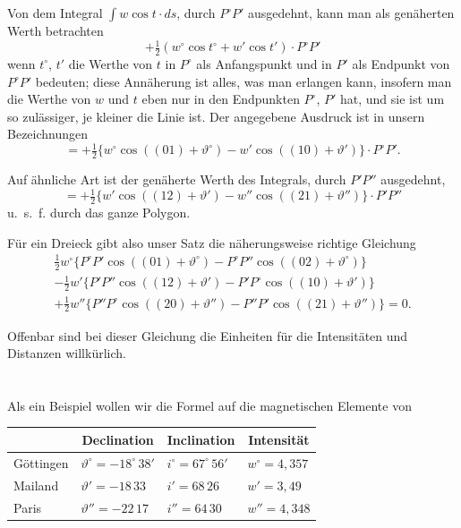 \documentclass[fontsize=11pt,paper=a4,twoside,openany]{scrbook}
\begin{document}
Von dem Integral $\int w\cos t\cdot ds$, durch $P^{\circ}P'$ ausgedehnt, kann man als genäherten Werth betrachten
\[
+\tfrac{1}{2}(w^{\circ}\cos t^{\circ} + w'\cos t')\cdot P^{\circ}P'
\]
wenn $t^{\circ}$, $t'$ die Werthe von $t$ in $P^{\circ}$ als Anfangspunkt und in $P'$ als Endpunkt von $P^{\circ}P'$ bedeuten; diese Annäherung ist alles, was man erlangen kann, insofern man die Werthe von $w$ und $t$ eben nur in den Endpunkten $P^{\circ}$, $P'$ hat, und sie ist um so zulässiger, je kleiner die Linie ist. Der angegebene Ausdruck ist in unsern Bezeichnungen
\[
= +\tfrac{1}{2}\{w^{\circ}\cos((01)+\vartheta^{\circ}) - w'\cos((10)+\vartheta')\}\cdot P^{\circ}P'.
\]

Auf ähnliche Art ist der genäherte Werth des Integrals, durch $P'P''$ ausgedehnt,
\[
= +\tfrac{1}{2}\{w'\cos((12)+\vartheta') - w''\cos((21)+\vartheta'')\}\cdot P'P''
\]
u.~s.~f. durch das ganze Polygon.

Für ein Dreieck gibt also unser Satz die näherungsweise richtige Gleichung
\begin{multline*}
\tfrac{1}{2}w^{\circ}\{P^{\circ}P'\cos((01)+\vartheta^{\circ}) - P^{\circ}P''\cos((02)+\vartheta^{\circ})\}\\
- \tfrac{1}{2}w'\{P'P''\cos((12)+\vartheta') - P'P^{\circ}\cos((10)+\vartheta')\}\\
+ \tfrac{1}{2}w''\{P''P^{\circ}\cos((20)+\vartheta'') - P''P'\cos((21)+\vartheta'')\} = 0.
\end{multline*}

Offenbar sind bei dieser Gleichung die Einheiten für die Intensitäten und Distanzen willkürlich.

\section{}

Als ein Beispiel wollen wir die Formel auf die magnetischen Elemente von

\begin{center}
\begin{tabular}{l@{~}|@{~}l@{~}|@{~}l@{~}|@{~}l}
& \multicolumn{1}{c|}{Declination} & \multicolumn{1}{c|}{Inclination} & \multicolumn{1}{c}{Intensität} \\
\hline
Göttingen & $\vartheta^{\circ}=-18^{\circ}\,38'$ & $i^{\circ}=67^{\circ}\,56'$ & $w^{\circ}=4{,}357$ \\
Mailand & $\vartheta'=-18\,33$ & $i'=68\,26$ & $w'=3{,}49$ \\
Paris & $\vartheta''=-22\,17$ & $i''=64\,30$ & $w''=4{,}348$
\end{tabular}
\end{center}
\end{document}
